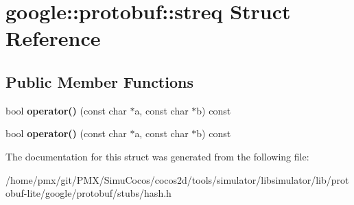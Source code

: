 \hypertarget{structgoogle_1_1protobuf_1_1streq}{}\section{google\+:\+:protobuf\+:\+:streq Struct Reference}
\label{structgoogle_1_1protobuf_1_1streq}
\subsection*{Public Member Functions}
\begin{DoxyCompactItemize}
\item 
\mbox{\label{structgoogle_1_1protobuf_1_1streq_a89c665eb52f014aebe53bccbd644e26e}} 
bool {\bfseries operator()} (const char $\ast$a, const char $\ast$b) const
\item 
\mbox{\label{structgoogle_1_1protobuf_1_1streq_a89c665eb52f014aebe53bccbd644e26e}} 
bool {\bfseries operator()} (const char $\ast$a, const char $\ast$b) const
\end{DoxyCompactItemize}


The documentation for this struct was generated from the following file\+:\begin{DoxyCompactItemize}
\item 
/home/pmx/git/\+P\+M\+X/\+Simu\+Cocos/cocos2d/tools/simulator/libsimulator/lib/protobuf-\/lite/google/protobuf/stubs/hash.\+h\end{DoxyCompactItemize}
